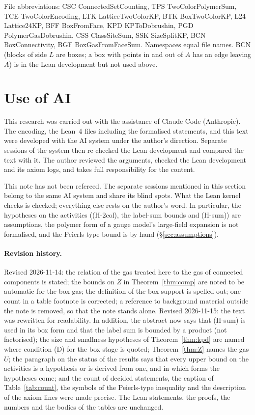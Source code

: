 \documentclass[11pt,a4paper]{article}
\theoremstyle{definition}
\theoremstyle{remark}
\DeclareRobustCommand{\lean}[1]{{\ttfamily\renewcommand{\_}{\textunderscore\allowbreak}#1}}
\begin{document}
{\sloppy\noindent File abbreviations: CSC \lean{ConnectedSetCounting}, TPS \lean{TwoColorPolymerSum}, TCE \lean{TwoColorEncoding}, LTK \lean{LatticeTwoColorKP}, BTK \lean{BoxTwoColorKP}, L24 \lean{Lattice24KP}, BFF \lean{BoxFromFace}, KPD \lean{KPToDobrushin}, PGD \lean{PolymerGasDobrushin}, CSS \lean{ClassSiteSum}, SSK \lean{SizeSplitKP}, BCN \lean{BoxConnectivity}, BGF \lean{BoxGasFromFaceSum}. Namespaces equal file names. BCN (blocks of side $L$ are boxes; a box with points in and out of $A$ has an edge leaving $A$) is in the Lean development but not used above.\par}

\section{Use of AI}\label{sec:ai}

This research was carried out with the assistance of Claude Code (Anthropic). The encoding, the Lean~4 files including the formalised statements, and this text were developed with the AI system under the author's direction. Separate sessions of the system then re-checked the Lean development and compared the text with it. The author reviewed the arguments, checked the Lean development and its axiom logs, and takes full responsibility for the content.

This note has not been refereed. The separate sessions mentioned in this section belong to the same AI system and share its blind spots. What the Lean kernel checks is checked; everything else rests on the author's word. In particular, the hypotheses on the activities ((H-2col), the label-sum bounds and (H-sum)) are assumptions, the polymer form of a gauge model's large-field expansion is not formalised, and the Peierls-type bound is by hand (\S\ref{sec:assumptions}).

\paragraph{Revision history.} Revised 2026-11-14: the relation of the gas treated here to the gas of connected components is stated; the bounds on $Z$ in Theorem~\ref{thm:comp} are noted to be automatic for the box gas; the definition of the box support is spelled out; one count in a table footnote is corrected; a reference to background material outside the note is removed, so that the note stands alone. Revised 2026-11-15: the text was rewritten for readability. In addition, the abstract now says that (H-sum) is used in its box form and that the label sum is bounded by a product (not factorised); the size and smallness hypotheses of Theorem~\ref{thm:kpd} are named where condition (D) for the box stage is quoted; Theorem~\ref{thm:Z} names the gas $U$; the paragraph on the status of the results says that every upper bound on the activities is a hypothesis or is derived from one, and in which forms the hypotheses come; and the count of decided statements, the caption of Table~\ref{tab:count}, the symbols of the Peierls-type inequality and the description of the axiom lines were made precise. The Lean statements, the proofs, the numbers and the bodies of the tables are unchanged.
\end{document}

